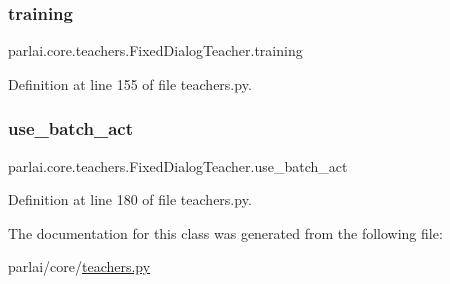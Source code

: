 \subsubsection{\texorpdfstring{training}{training}}
{\footnotesize\ttfamily parlai.\+core.\+teachers.\+Fixed\+Dialog\+Teacher.\+training}



Definition at line 155 of file teachers.\+py.

\mbox{\label{classparlai_1_1core_1_1teachers_1_1FixedDialogTeacher_a8a551d24fa77a0eb880cbee90b507f7e}} 
\subsubsection{\texorpdfstring{use\+\_\+batch\+\_\+act}{use\_batch\_act}}
{\footnotesize\ttfamily parlai.\+core.\+teachers.\+Fixed\+Dialog\+Teacher.\+use\+\_\+batch\+\_\+act}



Definition at line 180 of file teachers.\+py.



The documentation for this class was generated from the following file\+:\begin{DoxyCompactItemize}
\item 
parlai/core/\hyperlink{teachers_8py}{teachers.\+py}\end{DoxyCompactItemize}
